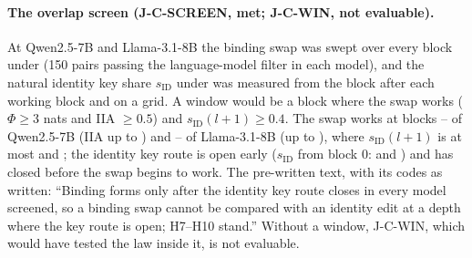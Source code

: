 \paragraph{The overlap screen (J-C-SCREEN, met; J-C-WIN, not evaluable).} At Qwen2.5-7B and Llama-3.1-8B the binding swap was swept over every block under \fmtNone{} (150 pairs passing the language-model filter in each model), and the natural identity key share $s_{\mathrm{ID}}$ under \fmtOpt{} was measured from the block after each working block and on a grid. A window would be a block where the swap works ($\Phi \geq 3$ nats and IIA $\geq 0.5$) and $s_{\mathrm{ID}}(l{+}1) \geq 0.4$. The swap works at blocks \JcScreenWbFirstQwenSeven{}--\JcScreenWbLastQwenSeven{} of Qwen2.5-7B (IIA up to \JcScreenMaxIIAQwenSeven{}) and \JcScreenWbFirstLlamaEight{}--\JcScreenWbLastLlamaEight{} of Llama-3.1-8B (up to \JcScreenMaxIIALlamaEight{}), where $s_{\mathrm{ID}}(l{+}1)$ is at most \JcScreenSidWbMaxQwenSeven{} and \JcScreenSidWbMaxLlamaEight{}; the identity key route is open early ($s_{\mathrm{ID}}$ from block 0: \JcScreenSidZeroQwenSeven{} and \JcScreenSidZeroLlamaEight{}) and has closed before the swap begins to work. The pre-written text, with its codes as written: ``Binding forms only after the identity key route closes in every model screened, so a binding swap cannot be compared with an identity edit at a depth where the key route is open; H7--H10 stand.'' Without a window, J-C-WIN, which would have tested the law inside it, is not evaluable. %

